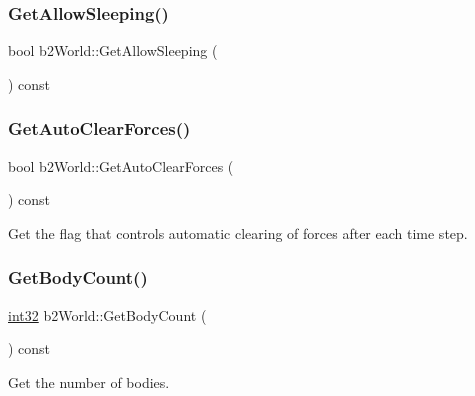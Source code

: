 \subsubsection{\texorpdfstring{GetAllowSleeping()}{GetAllowSleeping()}}
{\footnotesize\ttfamily bool b2\+World\+::\+Get\+Allow\+Sleeping (\begin{DoxyParamCaption}{ }\end{DoxyParamCaption}) const\hspace{0.3cm}{\ttfamily [inline]}}

\mbox{\label{classb2_world_ae1fa8272edf37a4e2a7be08f6e0a8cc6}} 
\subsubsection{\texorpdfstring{GetAutoClearForces()}{GetAutoClearForces()}}
{\footnotesize\ttfamily bool b2\+World\+::\+Get\+Auto\+Clear\+Forces (\begin{DoxyParamCaption}{ }\end{DoxyParamCaption}) const\hspace{0.3cm}{\ttfamily [inline]}}



Get the flag that controls automatic clearing of forces after each time step. 

\mbox{\label{classb2_world_a41c8b37baf5165c06932e8f08eb758de}} 
\subsubsection{\texorpdfstring{GetBodyCount()}{GetBodyCount()}}
{\footnotesize\ttfamily \mbox{\hyperlink{b2_settings_8h_a43d43196463bde49cb067f5c20ab8481}{int32}} b2\+World\+::\+Get\+Body\+Count (\begin{DoxyParamCaption}{ }\end{DoxyParamCaption}) const\hspace{0.3cm}{\ttfamily [inline]}}



Get the number of bodies. 

\mbox{\label{classb2_world_a1b87c03955e3312d308ddf679adf3c85}} 
